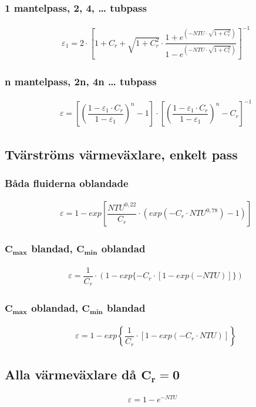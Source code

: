 	\subsubsection*{1 mantelpass, 2, 4, … tubpass}
	\begin{align*}
		& \varepsilon_1 = 2 \cdot \left[ 1 + C_r + \sqrt{1+C_r^2} \cdot \dfrac{1+e^{(-NTU \cdot \sqrt{1+C_r^2})}}{1-e^{(-NTU \cdot \sqrt{1+C_r^2})}}\right]^{-1}
	\end{align*}
	\subsubsection*{n mantelpass, 2n, 4n … tubpass}
	\begin{align*}
		& \varepsilon = \left[ \left(\dfrac{1- \varepsilon_1 \cdot C_r}{1 - \varepsilon_1} \right)^n - 1\right] \cdot \left[ \left(\dfrac{1- \varepsilon_1 \cdot C_r}{1 - \varepsilon_1} \right)^n - C_r\right]^{-1}
	\end{align*}
	\subsection*{Tvärströms värmeväxlare, enkelt pass}
	\subsubsection*{Båda fluiderna oblandade}
	\begin{align*}
		& \varepsilon = 1 - exp\left[{\dfrac{NTU^{0,22}}{C_r} \cdot \left(exp{(-C_r \cdot NTU^{0,78})} -1 \right)}\right]
	\end{align*}
	\subsubsection*{$\mathbf{C_{max}}$ blandad, $\mathbf{C_{min}}$ oblandad}
	\begin{align*}
	& \varepsilon = \dfrac{1}{C_r} \cdot ( 1- exp\{ -C_r \cdot [1 - exp(-NTU)]\})
	\end{align*}
	\subsubsection*{$\mathbf{C_{max}}$ oblandad, $\mathbf{C_{min}}$ blandad}
	\begin{align*}
	& \varepsilon = 1- exp\left\{ \dfrac{1}{C_r} \cdot [1 - exp(-C_r \cdot NTU)]\right\}
	\end{align*}
	\subsection*{Alla värmeväxlare då $\mathbf{C_r = 0}$}
	\begin{align*}
		\varepsilon = 1 - e^{-NTU}
	\end{align*}

